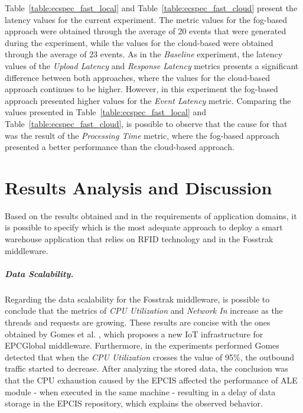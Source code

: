Table~\ref{table:ecspec_fast_local} and Table~\ref{table:ecspec_fast_cloud} present the latency values for the
current experiment. The metric values for the fog-based approach were obtained through the average
of 20 events that were generated during the experiment, while the values for the cloud-based were
obtained through the average of 23 events. As in the \textit{Baseline} experiment, the latency values
of the \textit{Upload Latency} and \textit{Response Latency} metrics presents a significant difference
between both approaches, where the values for the cloud-based approach continues to be higher.
However, in this experiment the fog-based approach presented higher values for the \textit{Event Latency}
metric. Comparing the values presented in Table~\ref{table:ecspec_fast_local} and Table~\ref{table:ecspec_fast_cloud},
is possible to observe that the cause for that was the result of the \textit{Processing Time}
metric, where the fog-based approach presented a better performance than the cloud-based approach.

\section{Results Analysis and Discussion}
\label{sec:eval_analysis}
Based on the results obtained and in the requirements of application domains, it is possible to specify
which is the most adequate approach to deploy a smart warehouse application that relies on \gls{RFID}
technology and in the Fosstrak middleware.

\subparagraph{Data Scalability.}
\label{subp:eval_results_data}
Regarding the data scalability for the Fosstrak middleware, is possible to conclude that the metrics
of \textit{CPU Utilization} and \textit{Network In} increase as the threads and requests are growing.
These results are concise with the ones obtained by Gomes et al. \cite{gomes2014future}, which
proposes a new \gls{IoT} infrastructure for \gls{EPC}Global middleware. Furthermore, in the experiments
performed Gomes detected that when the \textit{CPU Utilization} crosses the value of 95$\%$, the
outbound traffic started to decrease. After analyzing the stored data, the conclusion was that the
\gls{CPU} exhaustion caused by the \gls{EPCIS} affected the performance of \gls{ALE} module - when
executed in the same machine - resulting in a delay of data storage in the \gls{EPCIS} repository,
which explains the observed behavior.\\

